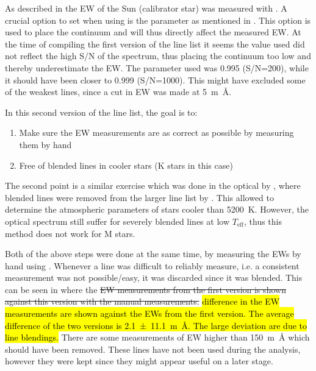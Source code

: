 As described in  the EW of the Sun (calibrator star) was measured with
. A crucial option to set when using  is the  parameter as
mentioned in . This option is used to place the continuum and will thus directly
affect the measured EW. At the time of compiling the first version of the line list it seems the
 value used did not reflect the high S/N of the spectrum, thus placing the continuum too
low and thereby underestimate the EW. The  parameter used was 0.995 (S/N=200), while it
should have been closer to 0.999 (S/N=1000). This might have excluded some of the weakest lines,
since a cut in EW was made at \SI{5}{m\angstrom}.

In this second version of the line list, the goal is to:
\begin{enumerate}
  \item Make sure the EW measurements are as correct as possible by measuring them by hand
  \item Free of blended lines in cooler stars (K stars in this case)
\end{enumerate}
The second point is a similar exercise which was done in the optical by \citet{Tsantaki2013}, where
blended lines were removed from the larger line list by \citet{Sousa2008a}. This allowed to
determine the atmospheric parameters of stars cooler than \SI{5200}{K}. However, the optical
spectrum still suffer for severely blended lines at low $T_\mathrm{eff}$, thus this method does not
work for M stars.

Both of the above steps were done at the same time, by measuring the EWs by hand using .
Whenever a line was difficult to reliably measure, i.e. a consistent measurement was not
possible/easy, it was discarded since it was blended. This can be seen in
 where the \st{EW measurements from the first version is shown against
this version with the manual measurements.} \hl{difference in the EW measurements are shown against
the EWs from the first version. The average difference of the two versions is
\SI{2.1+-11.1}{m\angstrom}. The large deviation are due to line blendings.} There are some
measurements of EW higher than \SI{150}{m\angstrom} which should have been removed. These lines have
not been used during the analysis, however they were kept since they might appear useful on a later
stage.

